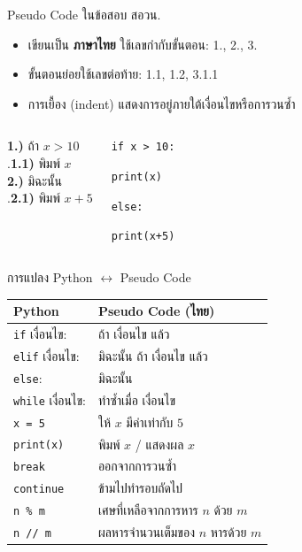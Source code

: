 \documentclass[11pt, aspectratio=169]{beamer}
\begin{document}
\begin{frame}{Pseudo Code ในข้อสอบ สอวน.}
  \begin{explanation}[รูปแบบ]
    \begin{itemize}
      \item เขียนเป็น \textbf{ภาษาไทย} ใช้เลขกำกับขั้นตอน: 1., 2., 3.
      \item ขั้นตอนย่อยใช้เลขต่อท้าย: 1.1, 1.2, 3.1.1
      \item การเยื้อง (indent) แสดงการอยู่ภายใต้เงื่อนไขหรือการวนซํ้า
    \end{itemize}
  \end{explanation}

  \begin{columns}[T]
      \begin{pseudobox}
        \textbf{1.)} ถ้า $x > 10$ \\
        .\qquad \textbf{1.1)} พิมพ์ $x$ \\
        \textbf{2.)} มิฉะนั้น \\
        .\qquad \textbf{2.1)} พิมพ์ $x+5$
      \end{pseudobox}
      \begin{exambox}
        \texttt{if x > 10:}

        \qquad \texttt{print(x)}

        \texttt{else:}

        \qquad \texttt{print(x+5)}
      \end{exambox}
  \end{columns}
\end{frame}

\begin{frame}{การแปลง Python $\leftrightarrow$ Pseudo Code}
  \begin{explanation}
    \begin{tabular}{l|l}
      \textbf{Python} & \textbf{Pseudo Code (ไทย)} \\
      \hline
      \texttt{if} เงื่อนไข: & ถ้า เงื่อนไข แล้ว \\
      \texttt{elif} เงื่อนไข: & มิฉะนั้น ถ้า เงื่อนไข แล้ว \\
      \texttt{else}: & มิฉะนั้น \\
      \texttt{while} เงื่อนไข: & ทำซํ้าเมื่อ เงื่อนไข \\
      \texttt{x = 5} & ให้ $x$ มีค่าเท่ากับ $5$ \\
      \texttt{print(x)} & พิมพ์ $x$ / แสดงผล $x$ \\
      \texttt{break} & ออกจากการวนซํ้า \\
      \texttt{continue} & ข้ามไปทำรอบถัดไป \\
      \texttt{n \% m} & เศษที่เหลือจากการหาร $n$ ด้วย $m$ \\
      \texttt{n // m} & ผลหารจำนวนเต็มของ $n$ หารด้วย $m$ \\
    \end{tabular}
  \end{explanation}
\end{frame}
\end{document}
